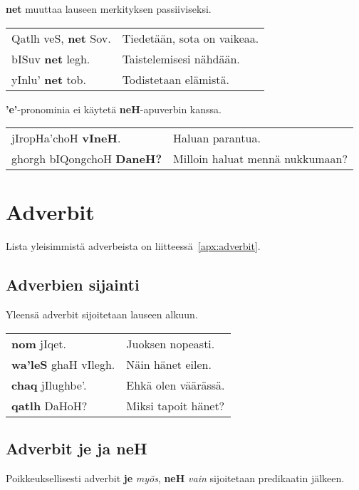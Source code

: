 \documentclass{book}
\begin{document}
\textbf{net} muuttaa lauseen merkityksen passiiviseksi.

\begin{tabular}{l l}
    Qatlh veS, \textbf{net} Sov. & Tiedetään, sota on vaikeaa. \\
    bISuv \textbf{net} legh. & Taistelemisesi nähdään. \\
    yInlu' \textbf{net} tob. & Todistetaan elämistä. \\
\end{tabular}

\textbf{'e'}-pronominia ei käytetä \textbf{neH}-apuverbin kanssa.

\begin{tabular}{l l}
    jIropHa'choH \textbf{vIneH}. & Haluan parantua. \\
    ghorgh bIQongchoH \textbf{DaneH?} & Milloin haluat mennä nukkumaan? \\
\end{tabular}

\chapter{Adverbit}

Lista yleisimmistä adverbeista on liitteessä~\ref{apx:adverbit}.

\section{Adverbien sijainti}

Yleensä adverbit sijoitetaan lauseen alkuun.

\begin{tabular}{l l}
    \textbf{nom} jIqet. & Juoksen nopeasti. \\
    \textbf{wa'leS} ghaH vIlegh. & Näin hänet eilen. \\
    \textbf{chaq} jIlughbe'. & Ehkä olen väärässä. \\
    \textbf{qatlh} DaHoH? & Miksi tapoit hänet? \\
\end{tabular}

\section{Adverbit je ja neH}

Poikkeuksellisesti adverbit \textbf{je} \textit{myös}, \textbf{neH} \textit{vain} sijoitetaan predikaatin jälkeen.
\end{document}
